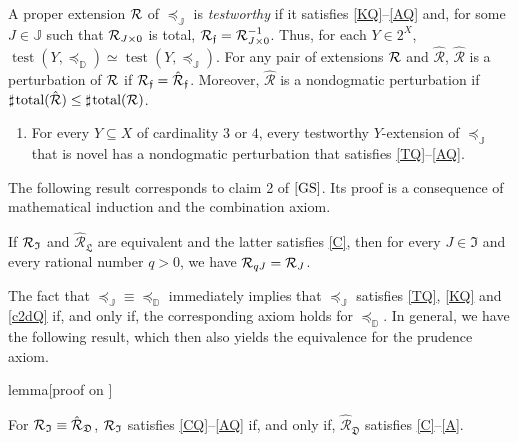 \documentclass[12pt,a4paper,twoside]{article}
\newcommand{\gsii}{$\textup{[GS]}$}
\newcommand{\novel}{\mathfrak f}
\newcommand{\test}{\operatorname{test}}
\newcommand{\preceqb}{\mathbin{\preceq}}
\newcommand{\countof}{\mathbin{\sharp}\hskip1pt}
\newcommand{\ext}{\mathrel{\mc R}}
\newcommand{\extb}{\mathbin{\mc R}}
\newcommand{\hext}{\mathrel{\hat{\mathrel{\mathcal R}}}}
\newcommand{\hextb}{\mathbin{\hat{\mathbin{\mathcal R}}}}
\newcommand{\total}{\textup{total}}
\newcommand{\mbbd}{{\mathds D}}
\newcommand{\mbbdpp}{{\mathfrak D}}
\newcommand{\mbbipp}{{\mathfrak L}}
\newcommand{\mbbj}{\mathds J}
\newcommand{\mbbjpp}{\mathfrak I}
\begin{document}
\begin{appendices}
\begin{enumerate}[label=\textup{A\arabic*}$^{'\flat}$,resume]

\end{enumerate}


A proper extension $ \ext $ of $ \preceqb _{ \mbbj }$ is \emph{testworthy} if
it satisfies \ref{KQ}--\ref{AQ} and, for some $J\in \mbbj$ such that
$\ext_{J\times 0 }$ is total, $\extb_{\novel} = \extb_{J\times 0}^{-1}$. Thus,
for each $ Y \in 2 ^ { X } $,
$ \test ( Y , \preceqb _{ \mbbd } ) \simeq \test ( Y , \preceqb _{ \mbbj
})$. For any pair of extensions $\ext $ and $\hext $, $\hext $ is a perturbation
of $\ext$ if $\extb_{\novel} = \hextb_{\novel}$. Moreover, $\hext$ is a
nondogmatic perturbation if
$\countof \total (\hext) \leq \countof \total (\ext) $.
\begin{enumerate}[label=\textit{4}-\textup{P}$^{\flat}$]
\item\label{PQ} For every $Y \subseteq X$ of cardinality $3$ or $4$, every
  testworthy $ Y $-extension of $ \preceqb _{ \mbbj }$ that is novel has a
  nondogmatic perturbation that satisfies \ref{TQ}–\ref{AQ}.
\end{enumerate}


The following result corresponds to claim 2 of \gsii. Its proof is a consequence
of mathematical induction and the combination axiom.
\begin{lemma}\label{lem-coneQ}

  If $ \ext _ \mbbjpp $ and $ \hext _ \mbbipp $ are equivalent and the latter
satisfies \ref{C}, then for every $ J \in \mbbjpp $ and every rational number
$ q >0 $, we have $ \extb _{ q J }  =  \extb _{J} $.

\end{lemma}
The fact that $\preceqb_{\mbbj}\equiv \preceqb_{\mbbd}$ immediately implies
that $\preceqb_{\mbbj}$ satisfies \ref{TQ}, \ref{KQ} and \ref{c2dQ} if, and
only if, the corresponding axiom holds for $\preceq_{\mbbd}$. In general, we
have the following result, which then also yields the equivalence for the
prudence axiom.

\begin{theoremEnd}{lemma}[proof on ]
  \label{lem-axiomsQ}

  For $ \extb _{ \mbbjpp } \equiv \hextb _{ \mbbdpp }$, $ \ext _ { \mbbjpp} $ satisfies
  \ref{CQ}--\ref{AQ} if, and only if, $ \hext_{\mbbdpp} $ satisfies
  \ref{C}--\ref{A}.
\end{theoremEnd}


\end{appendices}
\end{document}
